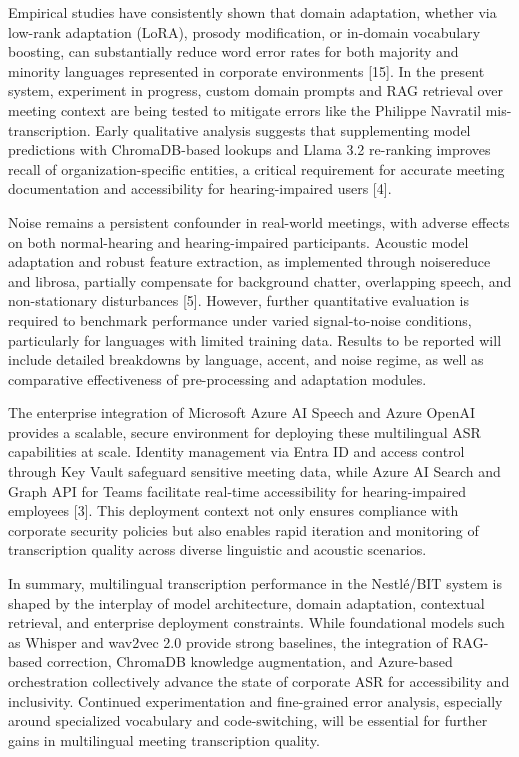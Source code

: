 \documentclass[12pt,a4paper]{article}
\begin{document}
Empirical studies have consistently shown that domain adaptation, whether via low-rank adaptation (LoRA), prosody modification, or in-domain vocabulary boosting, can substantially reduce word error rates for both majority and minority languages represented in corporate environments [15]. In the present system, experiment in progress, custom domain prompts and RAG retrieval over meeting context are being tested to mitigate errors like the Philippe Navratil mis-transcription. Early qualitative analysis suggests that supplementing model predictions with ChromaDB-based lookups and Llama 3.2 re-ranking improves recall of organization-specific entities, a critical requirement for accurate meeting documentation and accessibility for hearing-impaired users [4].


Noise remains a persistent confounder in real-world meetings, with adverse effects on both normal-hearing and hearing-impaired participants. Acoustic model adaptation and robust feature extraction, as implemented through noisereduce and librosa, partially compensate for background chatter, overlapping speech, and non-stationary disturbances [5]. However, further quantitative evaluation is required to benchmark performance under varied signal-to-noise conditions, particularly for languages with limited training data. Results to be reported will include detailed breakdowns by language, accent, and noise regime, as well as comparative effectiveness of pre-processing and adaptation modules.


The enterprise integration of Microsoft Azure AI Speech and Azure OpenAI provides a scalable, secure environment for deploying these multilingual ASR capabilities at scale. Identity management via Entra ID and access control through Key Vault safeguard sensitive meeting data, while Azure AI Search and Graph API for Teams facilitate real-time accessibility for hearing-impaired employees [3]. This deployment context not only ensures compliance with corporate security policies but also enables rapid iteration and monitoring of transcription quality across diverse linguistic and acoustic scenarios.


In summary, multilingual transcription performance in the Nestlé/BIT system is shaped by the interplay of model architecture, domain adaptation, contextual retrieval, and enterprise deployment constraints. While foundational models such as Whisper and wav2vec 2.0 provide strong baselines, the integration of RAG-based correction, ChromaDB knowledge augmentation, and Azure-based orchestration collectively advance the state of corporate ASR for accessibility and inclusivity. Continued experimentation and fine-grained error analysis, especially around specialized vocabulary and code-switching, will be essential for further gains in multilingual meeting transcription quality.
\end{document}
